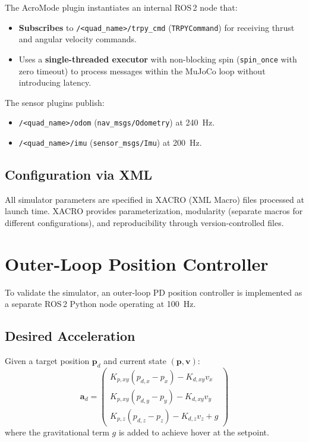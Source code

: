 \documentclass[journal]{IEEEtran}
\begin{document}
The AcroMode plugin instantiates an internal ROS\,2 node that:
\begin{itemize}
  \item \textbf{Subscribes} to \texttt{/<quad\_name>/trpy\_cmd} (\texttt{TRPYCommand}) for receiving thrust and angular velocity commands.
  \item Uses a \textbf{single-threaded executor} with non-blocking spin (\texttt{spin\_once} with zero timeout) to process messages within the MuJoCo loop without introducing latency.
\end{itemize}

The sensor plugins publish:
\begin{itemize}
  \item \texttt{/<quad\_name>/odom} (\texttt{nav\_msgs/Odometry}) at \SI{240}{Hz}.
  \item \texttt{/<quad\_name>/imu} (\texttt{sensor\_msgs/Imu}) at \SI{200}{Hz}.
\end{itemize}

\subsection{Configuration via XML}

All simulator parameters are specified in XACRO (XML Macro) files processed at launch time. XACRO provides parameterization, modularity (separate macros for different configurations), and reproducibility through version-controlled files.


\section{Outer-Loop Position Controller}
\label{sec:outerloop}

To validate the simulator, an outer-loop PD position controller is implemented as a separate ROS\,2 Python node operating at \SI{100}{Hz}.

\subsection{Desired Acceleration}

Given a target position $\mathbf{p}_d$ and current state $(\mathbf{p}, \mathbf{v})$:
\begin{equation}
  \mathbf{a}_d = \begin{pmatrix}
    K_{p,xy}(p_{d,x} - p_x) - K_{d,xy} v_x \\
    K_{p,xy}(p_{d,y} - p_y) - K_{d,xy} v_y \\
    K_{p,z}(p_{d,z} - p_z) - K_{d,z} v_z + g
  \end{pmatrix}
  \label{eq:desired_accel}
\end{equation}
where the gravitational term $g$ is added to achieve hover at the setpoint.
\end{document}
